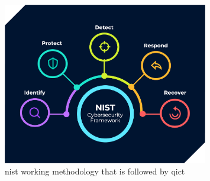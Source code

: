\begin{multicols}{2}

\end{multicols}


\begin{figure}[htbp]
      \centering
      \includegraphics[width=0.8\textwidth]{Figures/qict-working-method.png}
      \caption{\acrshort{nist} working methodology that is followed by \acrshort{qict}}
\end{figure}

